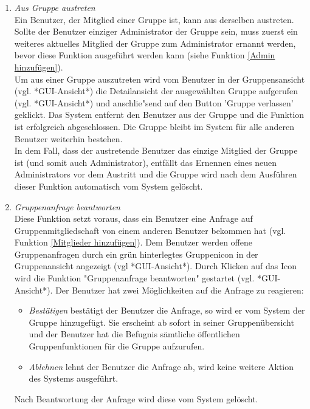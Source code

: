 \documentclass[parskip=full]{scrartcl}
\def\threedigits#1{%
  \ifnum#1<100 0\fi
  \ifnum#1<10 0\fi
  \number#1}
\begin{document}
\begin{enumerate}[label={\textbf{/F\protect\threedigits{\theenumi}0/}}, leftmargin=*, resume]
	
	\item \textit{Aus Gruppe austreten}\\
	Ein \gls{Benutzer}, der Mitglied einer Gruppe ist, kann aus derselben austreten. Sollte der Benutzer einziger Administrator der Gruppe sein, muss zuerst ein weiteres aktuelles Mitglied der Gruppe zum Administrator ernannt werden, bevor diese Funktion ausgeführt werden kann (siehe Funktion \ref{Admin hinzufügen}). \\
	Um aus einer Gruppe auszutreten wird vom Benutzer in der Gruppensansicht (vgl. *GUI-Ansicht*) die Detailansicht der ausgewählten Gruppe aufgerufen (vgl. *GUI-Ansicht*) und anschlie"send auf den Button 'Gruppe verlassen' geklickt. Das System entfernt den Benutzer aus der Gruppe und die Funktion ist erfolgreich abgeschlossen. Die Gruppe bleibt im System für alle anderen Benutzer weiterhin bestehen.\\
	In dem Fall, dass der austretende Benutzer das einzige Mitglied der Gruppe ist (und somit auch Administrator), entfällt das Ernennen eines neuen Administrators vor dem Austritt und die Gruppe wird nach dem Ausführen dieser Funktion automatisch vom System gelöscht.
	
	\item \textit{Gruppenanfrage beantworten} \label{Gruppenanfrage beantworten} \\
	Diese Funktion setzt voraus, dass ein Benutzer eine Anfrage auf Gruppenmitgliedschaft von einem anderen Benutzer bekommen hat (vgl. Funktion \ref{Mitglieder hinzufügen}). Dem Benutzer werden offene Gruppenanfragen durch ein grün hinterlegtes Gruppenicon in der Gruppenansicht angezeigt (vgl *GUI-Ansicht*). Durch Klicken auf das Icon wird die Funktion "Gruppenanfrage beantworten" gestartet (vgl. *GUI-Ansicht*). Der Benutzer hat zwei Möglichkeiten auf die Anfrage zu reagieren:
	\begin{itemize}
		\item \textit{Bestätigen} bestätigt der Benutzer die Anfrage, so wird er vom System der Gruppe hinzugefügt. Sie erscheint ab sofort in seiner Gruppenübersicht und der Benutzer hat die Befugnis sämtliche öffentlichen Gruppenfunktionen für die Gruppe aufzurufen.
		\item \textit{Ablehnen} lehnt der Benutzer die Anfrage ab, wird keine weitere Aktion des Systems ausgeführt.
	\end{itemize}
Nach Beantwortung der Anfrage wird diese vom System gelöscht.
\end{enumerate}
\end{document}
